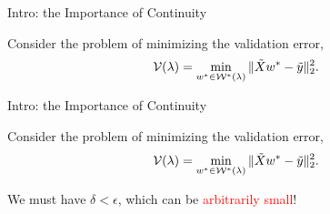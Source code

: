 \documentclass[usenames,dvipsnames,mathserif,notheorems]{beamer}
\newcommand{\red}[1]{\textcolor{Red}{#1}}
\begin{document}
\begin{frame}{Intro: the Importance of Continuity}

	Consider the problem of minimizing the validation error,
	\[
		\mathcal{V}(\lambda) = \min_{w^* \in \mathcal{W}^*(\lambda)} \|\tilde X w^* - \tilde y\|_2^2.
	\]

	\pause

	\begin{figure}[]
		\centering
		
	\end{figure}

\end{frame}

\begin{frame}{Intro: the Importance of Continuity}

	Consider the problem of minimizing the validation error,
	\[
		\mathcal{V}(\lambda) = \min_{w^* \in \mathcal{W}^*(\lambda)} \|\tilde X w^* - \tilde y\|_2^2.
	\]

	\begin{figure}[]
		\centering
		
	\end{figure}

	\pause
	We must have \( \delta < \epsilon \),
	which can be \red{arbitrarily small}!

\end{frame}
\end{document}
